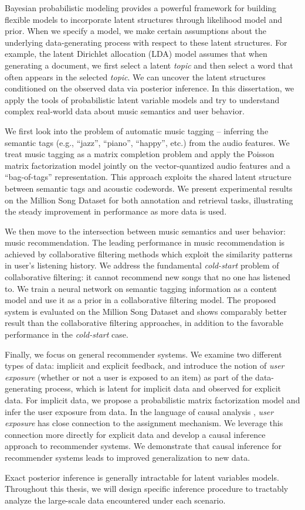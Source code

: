 
Bayesian probabilistic modeling provides a powerful framework for building flexible models to incorporate latent structures through likelihood model and prior. When we specify a model, we make certain assumptions about the underlying data-generating process with respect to these latent structures. For example, the latent Dirichlet allocation (LDA) model assumes that when generating a document, we first select a latent \textit{topic} and then select a word that often appears in the selected \textit{topic}. We can uncover the latent structures conditioned on the observed data via posterior inference. In this dissertation, we apply the tools of probabilistic latent variable models and try to understand complex real-world data about music semantics and user behavior. 

We first look into the problem of automatic music tagging -- inferring the semantic tags (e.g., ``jazz'', ``piano'', ``happy'', etc.) from the audio features. We treat music tagging as a matrix completion problem and apply the Poisson matrix factorization model jointly on the vector-quantized audio features and a ``bag-of-tags'' representation. This approach exploits the shared latent structure between semantic tags and acoustic codewords. We present experimental results on the Million Song Dataset for both annotation and retrieval tasks, illustrating the steady improvement in performance as more data is used. 

We then move to the intersection between music semantics and user behavior: music recommendation. The leading performance in music recommendation is achieved by collaborative filtering methods which exploit the similarity patterns in user's listening history. We address the fundamental \textit{cold-start} problem of collaborative filtering: it cannot recommend new songs that no one has listened to. We train a neural network on semantic tagging information as a content model and use it as a prior in a collaborative filtering model. The proposed system is evaluated on the Million Song Dataset and shows comparably better result than the collaborative filtering approaches, in addition to the favorable performance in the \textit{cold-start} case. 

Finally, we focus on general recommender systems. We examine two different types of data: implicit and explicit feedback, and introduce the notion of \textit{user exposure} (whether or not a user is exposed to an item) as part of the data-generating process, which is latent for implicit data and observed for explicit data. For implicit data, we propose a probabilistic matrix factorization model and infer the user exposure from data. In the language of causal analysis \citep{imbens2015causal}, \textit{user exposure} has close connection to the assignment mechanism. We leverage this connection more directly for explicit data and develop a causal inference approach to recommender systems. We demonstrate that causal inference for recommender systems leads to improved generalization to new data.

Exact posterior inference is generally intractable for latent variables models. Throughout this thesis, we will design specific inference procedure to tractably analyze the large-scale data encountered under each scenario. 

